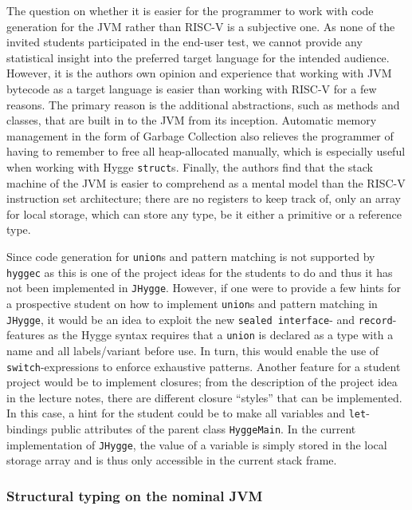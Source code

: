 The question on whether it is easier for the programmer to work with code generation for the JVM
rather than RISC-V is a subjective one. As none of the invited students participated in the end-user test, we cannot provide any statistical insight
into the preferred target language for the intended audience. However, it is the authors own opinion and experience that working with JVM bytecode as
a target language is easier than working with RISC-V for a few reasons. The primary reason is the additional abstractions, such as methods and classes,
that are built in to the JVM from its inception. Automatic memory management in the form of Garbage Collection also relieves the programmer of having
to remember to free all heap-allocated manually, which is especially useful when working with Hygge \texttt{struct}s. Finally, the authors find that
the stack machine of the JVM is easier to comprehend as a mental model than the RISC-V instruction set architecture; there are no registers to keep
track of, only an array for local storage, which can store any type, be it either a primitive or a reference type.

Since code generation for \texttt{union}s and pattern matching is not supported by \texttt{hyggec} as this is one of the project ideas for the students
to do and thus it has not been implemented in \texttt{JHygge}. However, if one were to provide a few hints for a prospective student on how to implement
\texttt{union}s and pattern matching in \texttt{JHygge}, it would be an idea to exploit the new \texttt{sealed interface}\cite{jep409}- and \texttt{record}\cite{jep395}-features
as the Hygge syntax requires that a \texttt{union} is declared as a type with a name and all labels/variant before use. In turn, this would enable
the use of \texttt{switch}-expressions to enforce exhaustive patterns. Another feature for a student project would be to implement closures;
from the description of the project idea in the lecture notes\cite{closures}, there are different closure ``styles'' that can be implemented.
In this case, a hint for the student could be to make all variables and \texttt{let}-bindings public attributes of the parent class \texttt{HyggeMain}.
In the current implementation of \texttt{JHygge}, the value of a variable is simply stored in the local storage array and is thus only accessible in
the current stack frame.

\subsubsection{Structural typing on the nominal JVM}

